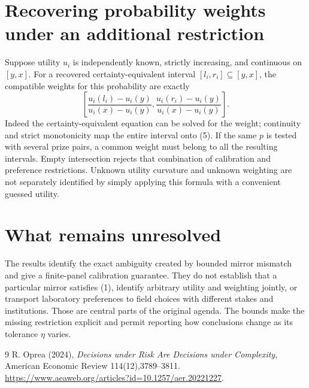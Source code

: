 \documentclass[11pt]{article}
\theoremstyle{definition}
\begin{document}
\section*{Recovering probability weights under an additional restriction}
Suppose utility $u_i$ is independently known, strictly increasing, and
continuous on $[y,x]$. For a recovered certainty-equivalent interval
$[l_i,r_i]\subseteq[y,x]$, the compatible weights for this probability are
exactly
\[
 \left[\frac{u_i(l_i)-u_i(y)}{u_i(x)-u_i(y)},
       \frac{u_i(r_i)-u_i(y)}{u_i(x)-u_i(y)}\right].        \tag{5}
\]
Indeed the certainty-equivalent equation can be solved for the weight;
continuity and strict monotonicity map the entire interval onto (5).
If the same $p$ is tested with several prize pairs, a common weight must
belong to all the resulting intervals. Empty intersection rejects that
combination of calibration and preference restrictions. Unknown utility
curvature and unknown weighting are not separately identified by simply
applying this formula with a convenient guessed utility.

\section*{What remains unresolved}
The results identify the exact ambiguity created by bounded mirror mismatch
and give a finite-panel calibration guarantee. They do not establish that
a particular mirror satisfies (1), identify arbitrary utility and weighting
jointly, or transport laboratory preferences to field choices with different
stakes and institutions. Those are central parts of the original agenda.
The bounds make the missing restriction explicit and permit reporting how
conclusions change as its tolerance $\eta$ varies.
\begin{thebibliography}{9}
 R. Oprea (2024), \emph{Decisions under Risk Are Decisions
under Complexity}, American Economic Review 114(12),3789--3811.
\url{https://www.aeaweb.org/articles?id=10.1257/aer.20221227}.
\end{thebibliography}
\end{document}
